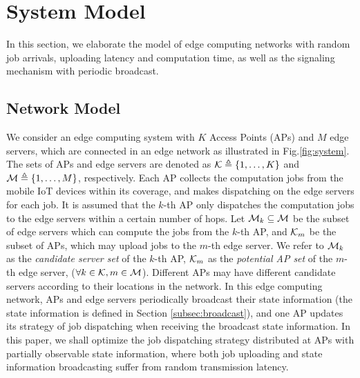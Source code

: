 \section{System Model}
\label{sec:model}
In this section, we elaborate the model of edge computing networks with random job arrivals, uploading latency and computation time, as well as the signaling mechanism with periodic broadcast.
\subsection{Network Model}
We consider an edge computing system with $K$ Access Points (APs) and $M$ edge servers, which are connected in an edge network as illustrated in Fig.\ref{fig:system}.
The sets of APs and edge servers are denoted as $\mathcal{K} \triangleq \{1,\dots,K\}$ and $\mathcal{M} \triangleq \{1,\dots,M\}$, respectively.
Each AP collects the computation jobs from the {mobile IoT devices} within its coverage, and makes dispatching  on the edge servers for each job.
It is assumed that the $k$-th AP only dispatches the computation jobs to the edge servers within a certain number of hops.
Let $\mathcal{M}_{k} \subseteq \mathcal{M}$ be the subset of edge servers which can compute the jobs from the $k$-th AP, and $\mathcal{K}_{m}$ be the subset of APs, which may upload jobs to the $m$-th edge server.
We refer to $\mathcal{M}_{k}$ as the \emph{candidate server set} of the $k$-th AP, $\mathcal{K}_{m}$ as the \emph{potential AP set} of the $m$-th edge server,  ($\forall k\in\mathcal{K}, m\in\mathcal{M}$).
Different APs may have different candidate servers according to their locations in the network.%
In this edge computing network, APs and edge servers periodically broadcast their state information (the state information is defined in Section \ref{subsec:broadcast}), and one AP updates its strategy of job dispatching when receiving the broadcast state information.
In this paper, we shall optimize the job dispatching strategy distributed at APs with partially observable state information, where both job uploading and state information broadcasting suffer from random transmission latency.

